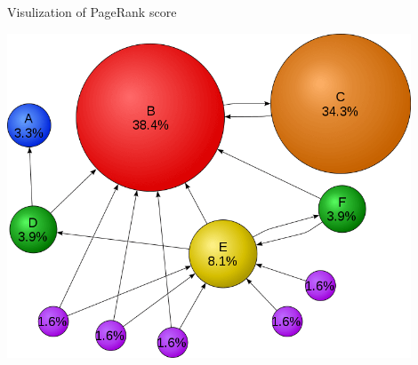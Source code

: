 \documentclass{beamer}
\begin{document}
\begin{frame}{Visulization of PageRank score}
    \begin{center}
        \includegraphics[width=0.9\textwidth]{pagerankexample.png}
    \end{center}
\end{frame}
\end{document}
